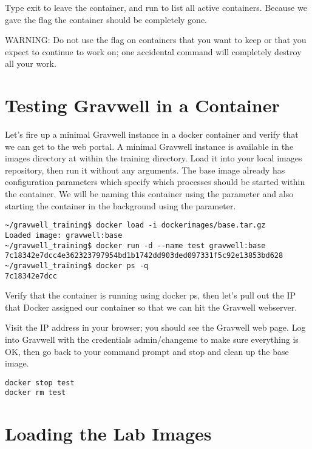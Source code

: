 Type exit to leave the container, and run  to list all
active containers. Because we gave the  flag the container
should be completely gone.

WARNING: Do not use the  flag on containers that you want
to keep or that you expect to continue to work on; one accidental
 command will completely destroy all your work.

\section{Testing Gravwell in a Container}

Let's fire up a minimal Gravwell instance in a docker container and
verify that we can get to the web portal. A minimal Gravwell instance
is available in the images directory at  within
the training directory. Load it into your local images repository,
then run it without any arguments. The base image already has
configuration parameters which specify which processes should be started
within the container. We will be naming this container  using
the  parameter and also starting the container in the
background using the  parameter.

\begin{Verbatim}[breaklines=true]
~/gravwell_training$ docker load -i dockerimages/base.tar.gz 
Loaded image: gravwell:base
~/gravwell_training$ docker run -d --name test gravwell:base
7c18342e7dcc4e362323797954bd1b1742dd903ded097331f5c92e13853bd628
~/gravwell_training$ docker ps -q
7c18342e7dcc
\end{Verbatim}

Verify that the container is running using docker ps, then let's pull
out the IP that Docker assigned our container so that we can hit the
Gravwell webserver.


Visit the IP address in your browser; you should see the Gravwell web page.
Log into Gravwell with the credentials admin/changeme to make sure everything is OK,
then go back to your command prompt and stop and clean up the base image.

\begin{Verbatim}[breaklines=true]
docker stop test
docker rm test
\end{Verbatim}

\section{Loading the Lab Images}
\label{sec:load-lab-images}

